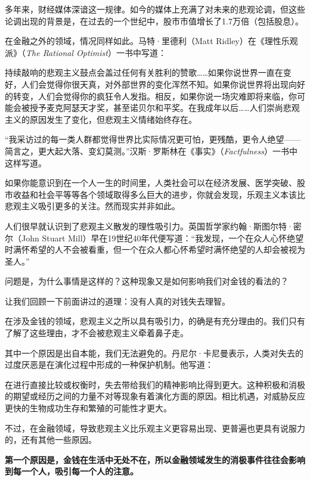 多年来，财经媒体深谙这一规律。如今的媒体上充满了对未来的悲观论调，但这些论调出现的背景是，在过去的一个世纪中，股市市值增长了1.7万倍（包括股息）。

在金融之外的领域，情况同样如此。马特·里德利（Matt Ridley）在《理性乐观派》（\textit{The Rational Optimist}）一书中写道：

{\kaishu

持续敲响的悲观主义鼓点会盖过任何有关胜利的赞歌……如果你说世界一直在变好，人们会觉得你很天真，对外部世界的变化浑然不知。如果你说世界将出现向好的转变，人们会觉得你的疯狂令人发指。相反，如果你说一场灾难即将来临，你可能会被授予麦克阿瑟天才奖，甚至诺贝尔和平奖。在我成年以后……人们崇尚悲观主义的原因发生了变化，但悲观主义情绪始终存在。

}

“我采访过的每一类人群都觉得世界比实际情况更可怕，更残酷，更令人绝望——简言之，更大起大落、变幻莫测。”汉斯·罗斯林在《事实》（\textit{Factfulness}）一书中这样写道。

如果你能意识到在一个人一生的时间里，人类社会可以在经济发展、医学突破、股市收益和社会平等等各个领域取得多么巨大的进步，你就会发现，乐观主义本该比悲观主义吸引更多的关注。然而现实并非如此。

人们很早就认识到了悲观主义散发的理性吸引力。英国哲学家约翰·斯图尔特·密尔（John Stuart Mill）早在19世纪40年代便写道：“我发现，一个在众人心怀绝望时满怀希望的人不会被看重，但一个在众人都心怀希望时满怀绝望的人却会被视为圣人。”

问题是，为什么事情是这样的？这种现象又是如何影响我们对金钱的看法的？

让我们回顾一下前面讲过的道理：没有人真的对钱失去理智。

在涉及金钱的领域，悲观主义之所以具有吸引力，的确是有充分理由的。我们只有了解了这些理由，才不会被悲观主义牵着鼻子走。

其中一个原因是出自本能，我们无法避免的。丹尼尔·卡尼曼表示，人类对失去的过度厌恶是在演化过程中形成的一种保护机制。他写道：

{\kaishu

在进行直接比较或权衡时，失去带给我们的精神影响比得到更大。这种积极和消极的期望或经历之间的力量不对等现象有着演化方面的原因。相比机遇，对威胁反应更快的生物成功生存和繁殖的可能性才更大。

}

不过，在金融领域，导致悲观主义比乐观主义更容易出现、更普遍也更具有说服力的，还有其他一些原因。

\textbf{第一个原因是，金钱在生活中无处不在，所以金融领域发生的消极事件往往会影响到每一个人，吸引每一个人的注意。}

